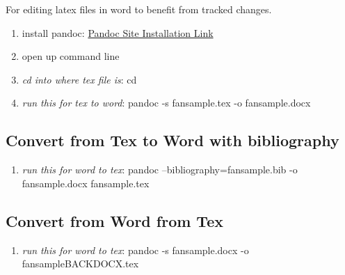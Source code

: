 \documentclass[12pt,english]{article}
\begin{document}
For editing latex files in word to benefit from tracked changes. 

\begin{enumerate}
	\item install pandoc: \href{https://pandoc.org/installing.html}{Pandoc Site Installation Link}
	\item open up command line
	\item \textit{cd into where tex file is}: cd 
	\item \textit{run this for tex to word}: pandoc -s fansample.tex -o fansample.docx
\end{enumerate}

\subsection{Convert from Tex to Word with bibliography}

\begin{enumerate}
	\item \textit{run this for word to tex}: pandoc --bibliography=fansample.bib -o fansample.docx fansample.tex
\end{enumerate}

\subsection{Convert from Word from Tex}

\begin{enumerate}
	\item \textit{run this for word to tex}: pandoc -s fansample.docx -o fansampleBACKDOCX.tex
\end{enumerate}


\printbibliography
\end{document}
